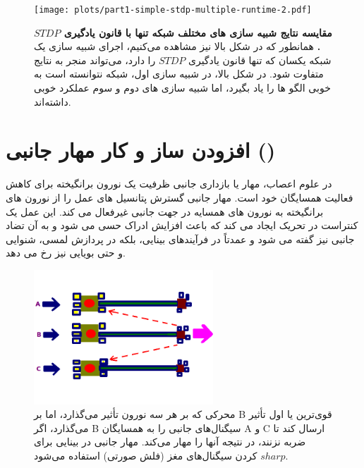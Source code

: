         \begin{figure}[!ht]
            \centering
            \texttt{[image: plots/part1-simple-stdp-multiple-runtime-2.pdf]} 
            \captionsetup{width=.9\linewidth}
            \caption{\textbf{مقایسه نتایج شبیه سازی های مختلف شبکه تنها با قانون یادگیری $STDP$.} همانطور که در شکل بالا نیز مشاهده می‌کنیم، اجرای شبیه سازی یک شبکه یکسان که تنها قانون یادگیری 
            $STDP$ 
            را دارد، می‌تواند منجر به نتایج متفاوت شود. در شکل بالا، در شبیه سازی اول، شبکه نتوانسته است به خوبی الگو ها را یاد بگیرد، اما شبیه سازی های دوم و سوم عملکرد خوبی داشته‌اند.}
            \label{fig:part1-simple-stdp-multiple-runtime}
        \end{figure}

\clearpage
\section{افزودن ساز و کار مهار جانبی ()}
    در علوم اعصاب، مهار یا بازداری جانبی ظرفیت یک نورون برانگیخته برای کاهش فعالیت همسایگان خود است. مهار جانبی گسترش پتانسیل های عمل را از نورون های برانگیخته به نورون های همسایه در جهت جانبی غیرفعال می کند. این عمل یک کنتراست در تحریک ایجاد می کند که باعث افزایش ادراک حسی می شود و به آن تضاد جانبی نیز گفته می شود و عمدتاً در فرآیندهای بینایی، بلکه در پردازش لمسی، شنوایی و حتی بویایی نیز رخ می دهد.
    \cite{Lateral-inhibition-wikipedia}
    \begin{figure}[!ht]
        \centering
        \includegraphics[width=0.6\textwidth]{images/Lateral_Inhibition.png} 
        \captionsetup{width=.8\linewidth}
        \caption{محرکی که بر هر سه نورون تأثیر می‌گذارد، اما بر 
        B
        قوی‌ترین یا اول تأثیر می‌گذارد، اگر B سیگنال‌های جانبی را به همسایگان 
        A و C 
        ارسال کند تا ضربه نزنند، در نتیجه آنها را مهار می‌کند. مهار جانبی در بینایی برای $sharp$ کردن سیگنال‌های مغز 
        (فلش صورتی) 
        استفاده می‌شود.}
        \label{fig:lateral-inhibition}
    \end{figure}


